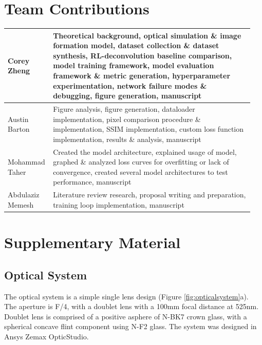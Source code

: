 \documentclass{article}
\begin{document}
\section{Team Contributions}
\begin{tabular}{p{0.15\linewidth} | p{0.8\linewidth}}
    \toprule
    Corey Zheng & Theoretical background, optical simulation \& image formation model, dataset collection \& dataset synthesis, RL-deconvolution baseline comparison, model training framework, model evaluation framework \& metric generation, hyperparameter experimentation, network failure modes \& debugging, figure generation, manuscript\\
    \midrule
    Austin Barton & Figure analysis, figure generation, dataloader implementation, pixel comparison procedure \& implementation, SSIM implementation, custom loss function implementation, results \& analysis, manuscript \\
    \midrule
    Mohammad Taher & Created the model architecture, explained usage of model, graphed \& analyzed loss curves for overfitting or lack of convergence, created several model architectures to test performance, manuscript \\
    \midrule
    Abdulaziz Memesh & Literature review research, proposal writing and preparation, training loop implementation, manuscript  \\
    \bottomrule
\end{tabular}




\newpage
\appendix
\section{Supplementary Material}
\label{sec:appendix}
\subsection{Optical System}
\label{sec:appendixOptical}
The optical system is a simple single lens design (Figure \ref{fig:opticalsystem}a). The aperture is F/4, with a doublet lens with a 100mm focal distance at 525nm. Doublet lens is comprised of a positive asphere of N-BK7 crown glass, with a spherical concave flint component using N-F2 glass. The system was designed in Ansys Zemax OpticStudio.
\end{document}

